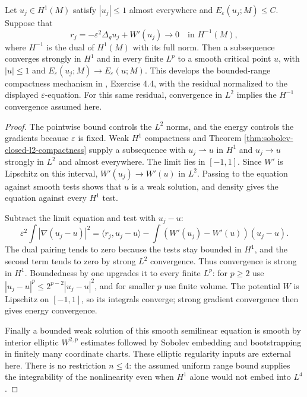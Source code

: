 \begin{theorem}\label{thm:phase-fixed-parameter-compactness}
Let $u_j\in H^1(M)$ satisfy $|u_j|\leq1$ almost everywhere and $E_\varepsilon(u_j;M)\leq C$. Suppose that
\[
 r_j=-\varepsilon^2\Delta_g u_j+W'(u_j)\longrightarrow0
       \quad\text{in }H^{-1}(M),
\]
where $H^{-1}$ is the dual of $H^1(M)$ with its full norm. Then a subsequence converges strongly in $H^1$ and in every finite $L^p$ to a smooth critical point $u$, with $|u|\leq1$ and $E_\varepsilon(u_j;M)\to E_\varepsilon(u;M)$. This develops the bounded-range compactness mechanism in \cite{ChAC}, Exercise 4.4, with the residual normalized to the displayed $\varepsilon$-equation. For this same residual, convergence in $L^2$ implies the $H^{-1}$ convergence assumed here.
\end{theorem}
\begin{proof}
The pointwise bound controls the $L^2$ norms, and the energy controls the gradients because $\varepsilon$ is fixed. Weak $H^1$ compactness and Theorem \ref{thm:sobolev-closed-l2-compactness} supply a subsequence with $u_j\rightharpoonup u$ in $H^1$ and $u_j\to u$ strongly in $L^2$ and almost everywhere. The limit lies in $[-1,1]$. Since $W'$ is Lipschitz on this interval, $W'(u_j)\to W'(u)$ in $L^2$. Passing to the equation against smooth tests shows that $u$ is a weak solution, and density gives the equation against every $H^1$ test.

Subtract the limit equation and test with $u_j-u$:
\[
 \varepsilon^2\int|\nabla(u_j-u)|^2
 =\langle r_j,u_j-u\rangle
   -\int(W'(u_j)-W'(u))(u_j-u).
\]
The dual pairing tends to zero because the tests stay bounded in $H^1$, and the second term tends to zero by strong $L^2$ convergence. Thus convergence is strong in $H^1$. Boundedness by one upgrades it to every finite $L^p$: for $p\geq2$ use $|u_j-u|^p\leq2^{p-2}|u_j-u|^2$, and for smaller $p$ use finite volume. The potential $W$ is Lipschitz on $[-1,1]$, so its integrals converge; strong gradient convergence then gives energy convergence.

Finally a bounded weak solution of this smooth semilinear equation is smooth by interior elliptic $W^{2,p}$ estimates followed by Sobolev embedding and bootstrapping in finitely many coordinate charts. These elliptic regularity inputs are external here. There is no restriction $n\leq4$: the assumed uniform range bound supplies the integrability of the nonlinearity even when $H^1$ alone would not embed into $L^4$.
\end{proof}

